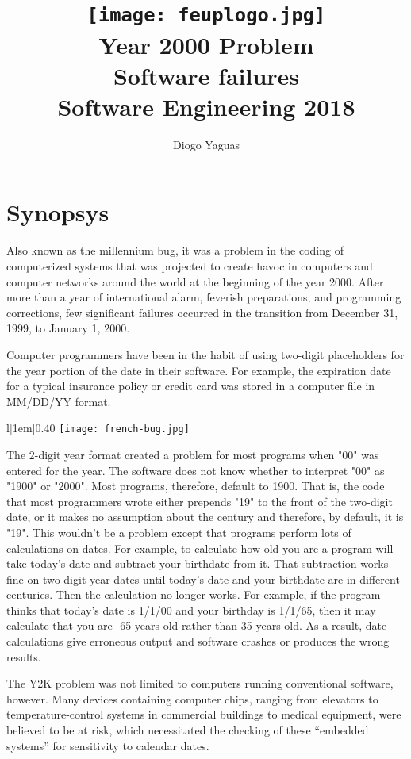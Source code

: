 \documentclass[12pt,a4paper,notitlepage]{article}
\title{
	\texttt{[image: feuplogo.jpg]}\\
	{\Huge Year 2000 Problem}\\
	{\Large Software failures}\\
	{\normalsize Software Engineering 2018}
}
\author{
	Diogo Yaguas\\ \text{up201606165}
}
\begin{document}
\maketitle
\thispagestyle{empty}

\section{Synopsys}

Also known as the millennium bug, it was a problem in the coding of computerized systems that was projected to create havoc in computers and computer networks around the world at the beginning of the year 2000. After more than a year of international alarm, feverish preparations, and programming corrections, few significant failures occurred in the transition from December 31, 1999, to January 1, 2000.

Computer programmers have been in the habit of using two-digit placeholders for the year portion of the date in their software. For example, the expiration date for a typical insurance policy or credit card was stored in a computer file in MM/DD/YY format.

\begin{wrapfigure}[10]{l}[1em]{0.40\textwidth}
	\vspace{-0.5\baselineskip}
	\texttt{[image: french-bug.jpg]}
\end{wrapfigure}

The 2-digit year format created a problem for most programs when "00" was entered for the year. The software does not know whether to interpret "00" as "1900" or "2000". Most programs, therefore, default to 1900. That is, the code that most programmers wrote either prepends "19" to the front of the two-digit date, or it makes no assumption about the century and therefore, by default, it is "19". This wouldn't be a problem except that programs perform lots of calculations on dates. For example, to calculate how old you are a program will take today's date and subtract your birthdate from it. That subtraction works fine on two-digit year dates until today's date and your birthdate are in different centuries. Then the calculation no longer works. For example, if the program thinks that today's date is 1/1/00 and your birthday is 1/1/65, then it may calculate that you are -65 years old rather than 35 years old. As a result, date calculations give erroneous output and software crashes or produces the wrong results.

The Y2K problem was not limited to computers running conventional software, however. Many devices containing computer chips, ranging from elevators to temperature-control systems in commercial buildings to medical equipment, were believed to be at risk, which necessitated the checking of these “embedded systems” for sensitivity to calendar dates.
\end{document}
